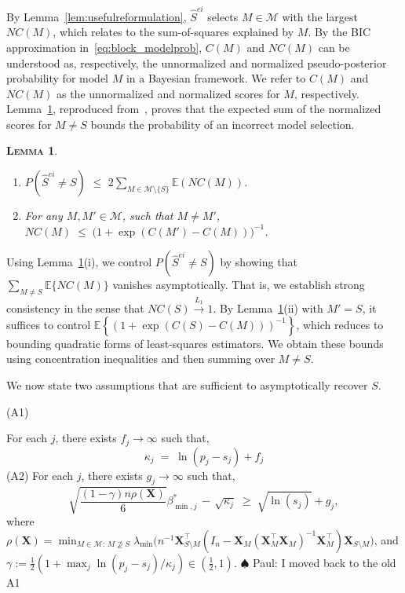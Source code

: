 \documentclass[
  12pt]{article}
\providecommand{\tightlist}{%
  \setlength{\itemsep}{0pt}\setlength{\parskip}{0pt}}\usepackage{longtable,booktabs,array}
\newcommand{\paul}[1]{{\small{\color{green} \sf $\spadesuit$ Paul: #1}}}
\newcommand{\E}{\mathbb{E}}
\newcommand{\M}{\mathcal{M}}
\newcommand{\bX}{\mathbf{X}}
\newtheorem{lem}[thm]{\textsc{Lemma}}
\begin{document}
By Lemma~\ref{lem:usefulreformulation}, $\hat{S}^{ei}$ selects
$M\in \M$ with the largest $NC(M)$, which relates to the sum-of-squares explained by $M$. By the BIC approximation in~\eqref{eq:block_modelprob}, $C(M)$ and $NC(M)$ can be understood as, respectively, the unnormalized and normalized pseudo-posterior probability for model $M$ in a Bayesian framework. 
We refer to $C(M)$ and $NC(M)$ as the unnormalized and normalized scores for $M$, respectively.
Lemma~\ref{lem:L0toL1convergence}, reproduced from~\cite{rossell2022concentration}, proves that the expected sum of the normalized scores for $M\neq S$ bounds the probability of an incorrect model selection. 
\begin{lem}\label{lem:L0toL1convergence}
\begin{enumerate}[label= (\roman*)]\tightlist
\item
$P(\hat{S}^{ei} \neq S) \,\,\leq \,\, 2 \sum_{M \in \M\setminus \{S\}} \E\left(NC(M)\right)$.
\item  For any $M,M'\in\M$, such that $M\neq M'$, 
$NC(M)\;\leq \;\big(1+\exp(C(M')-C(M))\big)^{-1}$.
\end{enumerate}
\end{lem}
Using Lemma~\ref{lem:L0toL1convergence}(i), we control $P(\hat{S}^{ei} \neq S)$ by showing that
$\sum_{M\neq S}\E\{NC(M)\}$ vanishes asymptotically.
That is, we establish strong consistency in the sense that $NC(S) \stackrel{L_1}{\longrightarrow} 1$.
By Lemma~\ref{lem:L0toL1convergence}(ii) with $M'=S$, it suffices to control
$\E\!\left\{(1+\exp(C(S)-C(M)))^{-1}\right\}$, which reduces to bounding quadratic forms
of least-squares estimators.
We obtain these bounds using concentration inequalities and then summing over $M\neq S$.


We now state two assumptions that are sufficient to asymptotically recover $S$.

\hypertarget{lab:A1}{(A1)} \quad For each $j$, there exists $f_j\to \infty$ such that, 
\begin{equation*}
    \kappa_j \;=\;\ln(p_j-s_j) + f_j
\end{equation*} 
\hypertarget{lab:A2}{(A2)} \quad For each $j$, there exists $g_j\to \infty$ such that,
    \begin{equation*}
        \sqrt{\frac{(1-\gamma) n\rho(\bX)}{6}}{\beta_{\min,j}^*} \,- \,\sqrt{\kappa_j} \;\geq\; \sqrt{\ln(s_j)} + g_j,
    \end{equation*}
where $\rho(\bX)=\min_{M \in \M:\, M\not \supseteq S} \lambda_{\min}\big({n}^{-1} \bX_{S \setminus M}^{\top}\left(I_n- \bX_{M}\left(\bX_{M}^{\top} \bX_{M}\right)^{-1} \bX_{M}^{\top}\right) \bX_{S \setminus M}\big)$, and $\gamma:=\tfrac12(1+\max_j\ln(p_j-s_j)/\kappa_j)\in (\tfrac12, 1)$.
\paul{I moved back to the old A1}
\end{document}
